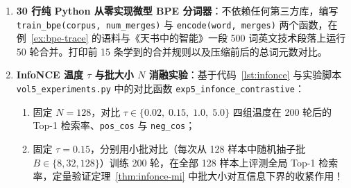 \begin{enumerate}
  \item[\textbf{5.5.5}] \textbf{30 行纯 Python 从零实现微型 BPE 分词器}：不依赖任何第三方库，编写 \texttt{train\_bpe(corpus, num\_merges)} 与 \texttt{encode(word, merges)} 两个函数，在例~\ref{ex:bpe-trace} 的语料与《天书中的智能》一段 500 词英文技术段落上运行 50 轮合并。打印前 15 条学到的合并规则以及压缩前后的总词元数对比。

  \item[\textbf{5.5.6}] \textbf{InfoNCE 温度 $\tau$ 与批大小 $N$ 消融实验}：基于代码~\ref{lst:infonce} 与实验脚本 \texttt{vol5\_experiments.py} 中的对比函数 \texttt{exp5\_\allowbreak infonce\_\allowbreak contrastive}：
  \begin{enumerate}
    \item 固定 $N = 128$，对比 $\tau \in \{0.02,\; 0.15,\; 1.0,\; 5.0\}$ 四组温度在 200 轮后的 Top-1 检索率、\texttt{pos\_cos} 与 \texttt{neg\_cos}；
    \item 固定 $\tau = 0.15$，分别用小批对比（每次从 128 样本中随机抽子批 $B \in \{8, 32, 128\}$）训练 200 轮，在全部 128 样本上评测全局 Top-1 检索率，定量验证定理~\ref{thm:infonce-mi} 中批大小对互信息下界的收紧作用！
  \end{enumerate}
\end{enumerate}


